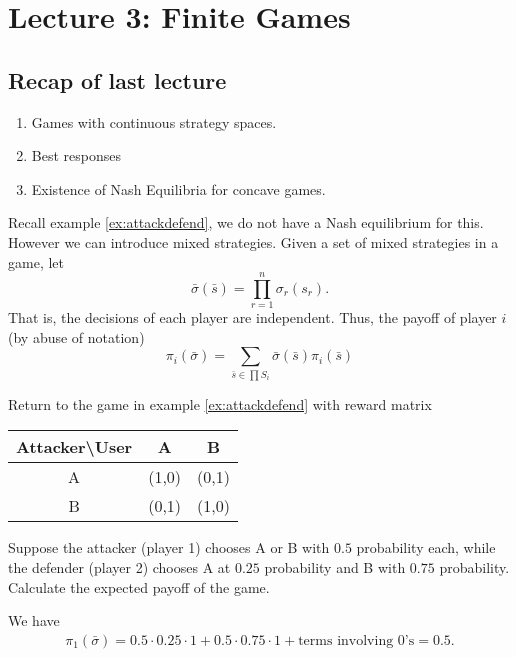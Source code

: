 \section{Lecture 3: Finite Games}
\newsection
\subsection*{Recap of last lecture}
\begin{enumerate}
    \item Games with continuous strategy spaces.
    \item Best responses
    \item Existence of Nash Equilibria for concave games.
\end{enumerate}

Recall example \ref{ex:attackdefend}, we do not have a Nash equilibrium for this. However we can introduce mixed strategies.
Given a set of mixed strategies in a game, let \[
    \bar{\sigma}(\bar{s}) = \prod_{r=1}^{n}\sigma_r(s_r).\]
That is, the decisions of each player are independent.
Thus, the payoff of player $i$ (by abuse of notation)\[
\pi_i(\bar{\sigma})=\sum_{\bar{s}\in \prod S_i} \bar{\sigma}(\bar{s})\pi_i(\bar{s})
\]
\begin{aexample}{}{}%
    Return to the game in example \ref{ex:attackdefend} with reward matrix
    \begin{center}
        \begin{tabular}{|c|c |c|} 
            \hline
            Attacker\textbackslash User & A&B \\ 
            \hline
            A & (1,0) & (0,1)\\ 
            \hline
            B & (0,1)&(1,0)\\
            \hline
        \end{tabular}
    \end{center}
    Suppose the attacker (player 1) chooses A or B with $0.5$ probability each, while the defender (player 2) chooses A at $0.25$ probability and B with $0.75$ probability.
    Calculate the expected payoff of the game.
\end{aexample}
We have\begin{align*}
    \pi_1(\bar{\sigma}) = 0.5\cdot 0.25 \cdot 1 + 0.5\cdot 0.75\cdot 1 + \textrm{terms involving $0$'s} = 0.5.
\end{align*}

